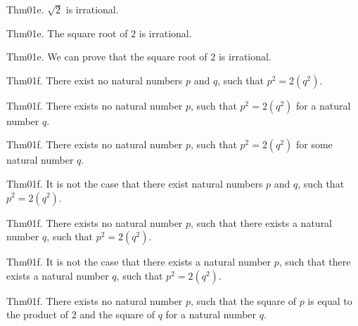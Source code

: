 \documentclass{article}
\begin{document}
Thm01e. $\sqrt{ 2}$ is irrational.

Thm01e. The square root of $2$ is irrational.

Thm01e. We can prove that the square root of $2$ is irrational.

Thm01f. There exist no natural numbers $p$ and $q$, such that $p ^{ 2}= 2 (q ^{ 2})$.

Thm01f. There exists no natural number $p$, such that $p ^{ 2}= 2 (q ^{ 2})$ for a natural number $q$.

Thm01f. There exists no natural number $p$, such that $p ^{ 2}= 2 (q ^{ 2})$ for some natural number $q$.

Thm01f. It is not the case that there exist natural numbers $p$ and $q$, such that $p ^{ 2}= 2 (q ^{ 2})$.

Thm01f. There exists no natural number $p$, such that there exists a natural number $q$, such that $p ^{ 2}= 2 (q ^{ 2})$.

Thm01f. It is not the case that there exists a natural number $p$, such that there exists a natural number $q$, such that $p ^{ 2}= 2 (q ^{ 2})$.

Thm01f. There exists no natural number $p$, such that the square of $p$ is equal to the product of $2$ and the square of $q$ for a natural number $q$.
\end{document}

